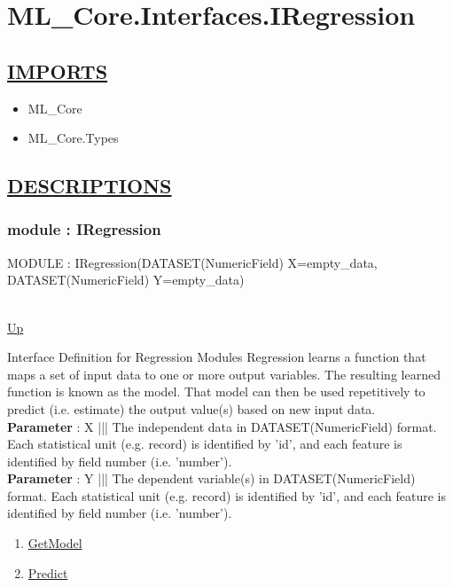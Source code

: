 \chapter*{ML\_Core.Interfaces.IRegression}
\hypertarget{ML_Core.Interfaces.IRegression}{}

\section*{\underline{IMPORTS}}
\begin{itemize}
\item ML\_Core
\item ML\_Core.Types
\end{itemize}

\section*{\underline{DESCRIPTIONS}}
\subsection*{module : IRegression}
\hypertarget{ecldoc:ml_core.interfaces.iregression}{MODULE : IRegression(DATASET(NumericField) X=empty\_data, DATASET(NumericField) Y=empty\_data)} \\
\hyperlink{ecldoc:}{Up} \\
\par
Interface Definition for Regression Modules Regression learns a function that maps a set of input data to one or more output variables. The resulting learned function is known as the model. That model can then be used repetitively to predict (i.e. estimate) the output value(s) based on new input data. \\
\textbf{Parameter} : X ||| The independent data in DATASET(NumericField) format. Each statistical unit (e.g. record) is identified by 'id', and each feature is identified by field number (i.e. 'number'). \\
\textbf{Parameter} : Y ||| The dependent variable(s) in DATASET(NumericField) format. Each statistical unit (e.g. record) is identified by 'id', and each feature is identified by field number (i.e. 'number'). \\
\begin{enumerate}
\item \hyperlink{ecldoc:ml_core.interfaces.iregression.getmodel}{GetModel}
\item \hyperlink{ecldoc:ml_core.interfaces.iregression.predict}{Predict}
\end{enumerate}
